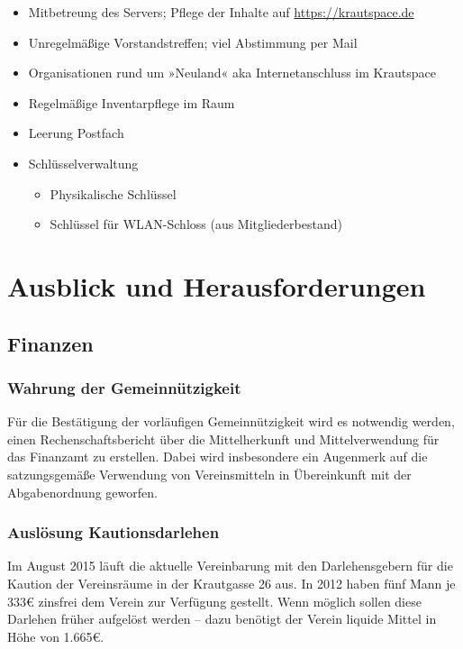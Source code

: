 \documentclass[10pt,DIV16]{scrartcl}
\begin{document}
\begin{itemize}
\begin{itemize}
		\end{itemize}
	\item Mitbetreung des Servers; Pflege der Inhalte auf \url{https://krautspace.de}
	\item Unregelmäßige Vorstandstreffen; viel Abstimmung per Mail
	\item Organisationen rund um »Neuland« aka Internetanschluss im Krautspace
	\item Regelmäßige Inventarpflege im Raum
	\item Leerung Postfach
	\item Schlüsselverwaltung
		\begin{itemize}
			\item Physikalische Schlüssel
			\item Schlüssel für WLAN-Schloss (aus Mitgliederbestand)
		\end{itemize}
\end{itemize}

\section{Ausblick und Herausforderungen}

\subsection{Finanzen}
\label{sec:ausblick:finanzen}

\subsubsection{Wahrung der Gemeinnützigkeit}

Für die Bestätigung der vorläufigen Gemeinnützigkeit wird es notwendig
werden, einen Rechenschaftsbericht über die Mittelherkunft und
Mittelverwendung für das Finanzamt zu erstellen. Dabei wird
insbesondere ein Augenmerk auf die satzungsgemäße Verwendung von
Vereinsmitteln in Übereinkunft mit der Abgabenordnung geworfen.

\subsubsection{Auslösung Kautionsdarlehen}
\label{sec:katrionsdarlehen}

Im August 2015 läuft die aktuelle Vereinbarung mit den Darlehensgebern
für die Kaution der Vereinsräume in der Krautgasse 26 aus. In 2012
haben fünf Mann je 333\euro{} zinsfrei dem Verein zur Verfügung gestellt.
Wenn möglich sollen diese Darlehen früher aufgelöst werden -- dazu
benötigt der Verein liquide Mittel in Höhe von 1.665\euro{}.
\end{document}
